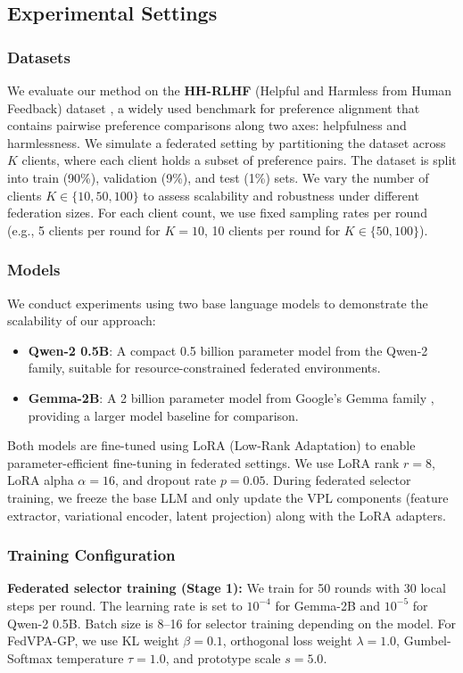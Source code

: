 \subsection{Experimental Settings}

\subsubsection{Datasets}
We evaluate our method on the \textbf{HH-RLHF} (Helpful and Harmless from Human Feedback) dataset \citep{bai2022training}, a widely used benchmark for preference alignment that contains pairwise preference comparisons along two axes: helpfulness and harmlessness. We simulate a federated setting by partitioning the dataset across $K$ clients, where each client holds a subset of preference pairs. The dataset is split into train (90\%), validation (9\%), and test (1\%) sets. We vary the number of clients $K \in \{10, 50, 100\}$ to assess scalability and robustness under different federation sizes. For each client count, we use fixed sampling rates per round (e.g., 5 clients per round for $K=10$, 10 clients per round for $K \in \{50, 100\}$).

\subsubsection{Models}
We conduct experiments using two base language models to demonstrate the scalability of our approach:
\begin{itemize}
    \item \textbf{Qwen-2 0.5B}: A compact 0.5 billion parameter model from the Qwen-2 \citep{yang2024qwen2} family, suitable for resource-constrained federated environments.
    \item \textbf{Gemma-2B}: A 2 billion parameter model from Google's Gemma family \citep{gemma2024gemma}, providing a larger model baseline for comparison.
\end{itemize}
Both models are fine-tuned using LoRA (Low-Rank Adaptation) \citep{hu2021lora} to enable parameter-efficient fine-tuning in federated settings. We use LoRA rank $r=8$, LoRA alpha $\alpha=16$, and dropout rate $p=0.05$. During federated selector training, we freeze the base LLM and only update the VPL components (feature extractor, variational encoder, latent projection) along with the LoRA adapters.

\subsubsection{Training Configuration}
\textbf{Federated selector training (Stage 1):} We train for 50 rounds with 30 local steps per round. The learning rate is set to $10^{-4}$ for Gemma-2B and $10^{-5}$ for Qwen-2 0.5B. Batch size is 8--16 for selector training depending on the model. For FedVPA-GP, we use KL weight $\beta=0.1$, orthogonal loss weight $\lambda=1.0$, Gumbel-Softmax temperature $\tau=1.0$, and prototype scale $s=5.0$.

